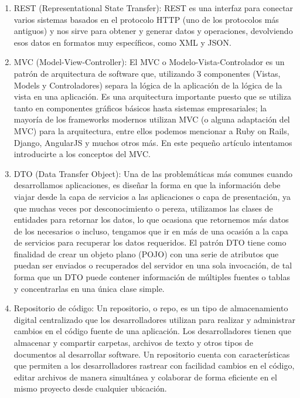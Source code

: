 \begin{enumerate}
    \item REST (Representational State Transfer): REST es una interfaz para conectar varios sistemas basados en el protocolo HTTP (uno de los protocolos más antiguos) y nos sirve para obtener y generar datos y operaciones, devolviendo esos datos en formatos muy específicos, como XML y JSON.\citep{openwebinarsRESTConoce}
    \item MVC (Model-View-Controller): El MVC o Modelo-Vista-Controlador es un patrón de arquitectura de software que, utilizando 3 componentes (Vistas, Models y Controladores) separa la lógica de la aplicación de la lógica de la vista en una aplicación. Es una arquitectura importante puesto que se utiliza tanto en componentes gráficos básicos hasta sistemas empresariales; la mayoría de los frameworks modernos utilizan MVC (o alguna adaptación del MVC) para la arquitectura, entre ellos podemos mencionar a Ruby on Rails, Django, AngularJS y muchos otros más. En este pequeño artículo intentamos introducirte a los conceptos del MVC.\citep{codigofacilitoModelView}
    \item DTO (Data Transfer Object): Una de las problemáticas más comunes cuando desarrollamos aplicaciones, es diseñar la forma en que la información debe viajar desde la capa de servicios a las aplicaciones o capa de presentación, ya que muchas veces por desconocimiento o pereza, utilizamos las clases de entidades para retornar los datos, lo que ocasiona que retornemos más datos de los necesarios o incluso, tengamos que ir en más de una ocasión a la capa de servicios para recuperar los datos requeridos.
    El patrón DTO tiene como finalidad de crear un objeto plano (POJO) con una serie de atributos que puedan ser enviados o recuperados del servidor en una sola invocación, de tal forma que un DTO puede contener información de múltiples fuentes o tablas y concentrarlas en una única clase simple.\citep{oscarblancarteblogDataTransfer}
    \item Repositorio de código: Un repositorio, o repo, es un tipo de almacenamiento digital centralizado que los desarrolladores utilizan para realizar y administrar cambios en el código fuente de una aplicación. Los desarrolladores tienen que almacenar y compartir carpetas, archivos de texto y otros tipos de documentos al desarrollar software. Un repositorio cuenta con características que permiten a los desarrolladores rastrear con facilidad cambios en el código, editar archivos de manera simultánea y colaborar de forma eficiente en el mismo proyecto desde cualquier ubicación.\citep{amazonQuCLI}

\end{enumerate}
